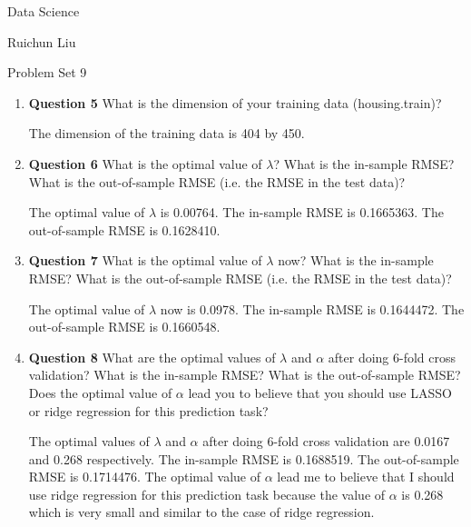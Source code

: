 \documentclass[11pt,a4paper]{article}
\begin{document}
	\begin{center}
		Data Science
		
		Ruichun Liu
		
		Problem Set 9
	\end{center}
\begin{enumerate}

    \item \textbf{Question 5} What is the dimension of your training         data (housing.train)?
		  \begin{description}
	             The dimension of the training data is 404 by 450.
          \end{description}

    \item \textbf{Question 6} What is the optimal value of       $\lambda$? What is the in-sample RMSE? What is         the out-of-sample RMSE (i.e. the RMSE in the test       data)?
		  \begin{description}
	             The optimal value of  $\lambda$ is 0.00764. The in-sample RMSE is 0.1665363. The out-of-sample RMSE is 0.1628410.  
          \end{description}
          
    \item \textbf{Question 7} What is the optimal value of $\lambda$         now? What is the in-sample RMSE? What is the out-of-sample         RMSE (i.e. the RMSE in the test data)?
		  \begin{description}
	            The optimal value of $\lambda$ now is 0.0978. The in-sample RMSE is 0.1644472. The out-of-sample         RMSE is 0.1660548.
          \end{description}
          
    \item \textbf{Question 8} What are the optimal values of $\lambda$       and $\alpha$ after doing 6-fold cross validation? What is the       in-sample RMSE? What is the out-of-sample RMSE? Does the
          optimal value of $\alpha$ lead you to believe that you should use LASSO or ridge regression
          for this prediction task?
		  \begin{description}
	            The optimal values of $\lambda$ and $\alpha$ after doing 6-fold cross validation are 0.0167 and 0.268 respectively. The in-sample RMSE is 0.1688519. The out-of-sample RMSE is 0.1714476. The
                optimal value of $\alpha$ lead me to believe that I should use ridge regression for this prediction task because the value of $\alpha$ is 0.268 which is very small and similar to the case of ridge regression.
          \end{description}
          

\end{enumerate}
\end{document}
